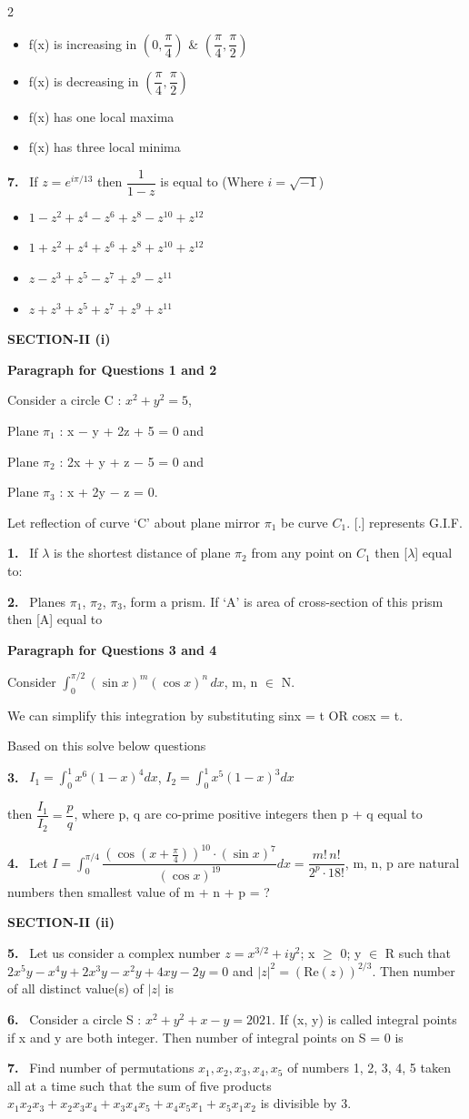 \documentclass[10pt]{extarticle}
\newcommand{\sect}[1]{\par\smallskip\noindent\textbf{#1}\par}
\newcommand{\qn}[1]{\par\smallskip\noindent\textbf{#1.}~}
\newcommand{\paraq}[2]{\par\smallskip\noindent\textbf{Paragraph for Questions #1 and #2}\par}
\newenvironment{qoptions}{\begin{itemize}[leftmargin=1.8em,itemsep=1pt,topsep=2pt,label={}]}{\end{itemize}}
\newcommand{\opt}[2]{\item[(#1)] #2}
\begin{document}
\begin{multicols}{2}
\begin{qoptions}
\opt{A}{f(x) is increasing in $\left(0,\dfrac\pi4\right)$ \& $\left(\dfrac\pi4,\dfrac\pi2\right)$}
\opt{B}{f(x) is decreasing in $\left(\dfrac\pi4,\dfrac\pi2\right)$}
\opt{C}{f(x) has one local maxima}
\opt{D}{f(x) has three local minima}
\end{qoptions}
\qn{7} If $z=e^{i\pi/13}$ then $\dfrac1{1-z}$ is equal to (Where $i=\sqrt{-1}$)
\begin{qoptions}
\opt{A}{$1-z^2+z^4-z^6+z^8-z^{10}+z^{12}$}
\opt{B}{$1+z^2+z^4+z^6+z^8+z^{10}+z^{12}$}
\opt{C}{$z-z^3+z^5-z^7+z^9-z^{11}$}
\opt{D}{$z+z^3+z^5+z^7+z^9+z^{11}$}
\end{qoptions}
\sect{SECTION-II (i)}
\paraq{1}{2}
Consider a circle C : $x^2+y^2=5$,\par
Plane $\pi_1$ : x $-$ y + 2z + 5 = 0 and\par
Plane $\pi_2$ : 2x + y + z $-$ 5 = 0 and\par
Plane $\pi_3$ : x + 2y $-$ z = 0.\par
Let reflection of curve `C' about plane mirror $\pi_1$ be curve $C_1$. [.] represents G.I.F.
\qn{1} If $\lambda$ is the shortest distance of plane $\pi_2$ from any point on $C_1$ then [$\lambda$] equal to:
\qn{2} Planes $\pi_1$, $\pi_2$, $\pi_3$, form a prism. If `A' is area of cross-section of this prism then [A] equal to
\paraq{3}{4}
Consider $\displaystyle\int_0^{\pi/2}(\sin x)^m(\cos x)^n\,dx$, m, n $\in$ N.\par
We can simplify this integration by substituting sinx = t OR cosx = t.\par
Based on this solve below questions
\qn{3} $I_1=\displaystyle\int_0^1x^6(1-x)^4dx$, $I_2=\displaystyle\int_0^1x^5(1-x)^3dx$\par
then $\dfrac{I_1}{I_2}=\dfrac pq$, where p, q are co-prime positive integers then p + q equal to
\qn{4} Let $I=\displaystyle\int_0^{\pi/4}\dfrac{\left(\cos\left(x+\frac\pi4\right)\right)^{10}\cdot(\sin x)^7}{(\cos x)^{19}}dx=\dfrac{m!\,n!}{2^p\cdot18!}$, m, n, p are natural numbers then smallest value of m + n + p = ?
\sect{SECTION-II (ii)}
\qn{5} Let us consider a complex number $z=x^{3/2}+iy^2$; x $\geqslant$ 0; y $\in$ R such that $2x^5y-x^4y+2x^3y-x^2y+4xy-2y=0$ and $|z|^2=(\text{Re}(z))^{2/3}$. Then number of all distinct value(s) of $|z|$ is
\qn{6} Consider a circle S : $x^2+y^2+x-y=2021$. If (x, y) is called integral points if x and y are both integer. Then number of integral points on S = 0 is
\qn{7} Find number of permutations $x_1,x_2,x_3,x_4,x_5$ of numbers 1, 2, 3, 4, 5 taken all at a time such that the sum of five products $x_1x_2x_3+x_2x_3x_4+x_3x_4x_5+x_4x_5x_1+x_5x_1x_2$ is divisible by 3.

\end{multicols}
\end{document}
